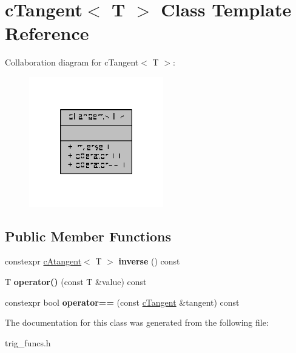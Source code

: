 \hypertarget{classcTangent}{\section{c\-Tangent$<$ T $>$ Class Template Reference}
\label{classcTangent}
}


Collaboration diagram for c\-Tangent$<$ T $>$\-:
\nopagebreak
\begin{figure}[H]
\begin{center}
\leavevmode
\includegraphics[width=166pt]{classcTangent__coll__graph}
\end{center}
\end{figure}
\subsection*{Public Member Functions}
\begin{DoxyCompactItemize}
\item 
\hypertarget{classcTangent_aaaad969e8f62a3a5a788b5bdf641375e}{constexpr \hyperlink{classcAtangent}{c\-Atangent}$<$ T $>$ {\bfseries inverse} () const }\label{classcTangent_aaaad969e8f62a3a5a788b5bdf641375e}

\item 
\hypertarget{classcTangent_a0f5effaff6bbab1bb6f8e2b4d5670a0f}{T {\bfseries operator()} (const T \&value) const }\label{classcTangent_a0f5effaff6bbab1bb6f8e2b4d5670a0f}

\item 
\hypertarget{classcTangent_a0612ee7953f81270d7df67b8aa01bb1b}{constexpr bool {\bfseries operator==} (const \hyperlink{classcTangent}{c\-Tangent} \&tangent) const }\label{classcTangent_a0612ee7953f81270d7df67b8aa01bb1b}

\end{DoxyCompactItemize}


The documentation for this class was generated from the following file\-:\begin{DoxyCompactItemize}
\item 
trig\-\_\-funcs.\-h\end{DoxyCompactItemize}
